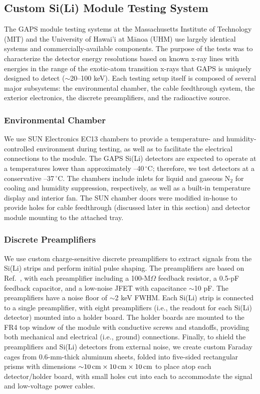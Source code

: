 \documentclass[journal]{IEEEtran}
\begin{document}
%
\subsection{Custom Si(Li) Module Testing System}
The GAPS module testing systems at the Massachusetts Institute of Technology (MIT) and the University of Hawai'i at M{\=a}noa (UHM) use largely identical systems and commercially-available components. The purpose of the tests was to characterize the detector energy resolutions based on known x-ray lines with energies in the range of the exotic-atom transition x-rays that GAPS is uniquely designed to detect (${\sim}$20--100 keV). Each testing setup itself is composed of several major subsystems: the environmental chamber, the cable feedthrough system, the exterior electronics, the discrete preamplifiers, and the radioactive source.
%
\subsubsection{Environmental Chamber}
We use SUN Electronics EC13 chambers to provide a temperature- and humidity-controlled environment during testing, as well as to facilitate the electrical connections to the module. The GAPS Si(Li) detectors are expected to operate at a temperatures lower than approximately --40$\,^{\circ}$C; therefore, we test detectors at a conservative --37$\,^{\circ}$C. The chambers include inlets for liquid and gaseous N$_2$ for cooling and humidity suppression, respectively, as well as a built-in temperature display and interior fan. The SUN chamber doors were modified in-house to provide holes for cable feedthrough (discussed later in this section) and detector module mounting to the attached tray. 
%
\subsubsection{Discrete Preamplifiers}
We use custom charge-sensitive discrete preamplifiers to extract signals from the Si(Li) strips and perform initial pulse shaping. The preamplifiers are based on Ref.~\cite{Fabris:1999}, with each preamplifier including a 100-M$\Omega$ feedback resistor, a 0.5-pF feedback capacitor, and a low-noise JFET with capacitance ${\sim}$10 pF. The preamplifiers have a noise floor of ${\sim}$2 keV FWHM. Each Si(Li) strip is connected to a single preamplifier, with eight preamplifiers (i.e., the readout for each Si(Li) detector) mounted into a holder board. The holder boards are mounted to the FR4 top window of the module with conductive screws and standoffs, providing both mechanical and electrical (i.e., ground) connections.  Finally, to shield the preamplifiers and Si(Li) detectors from external noise, we create custom Faraday cages from 0.6-mm-thick aluminum sheets, folded into five-sided rectangular prisms with dimensions ${\sim}10\text{\,cm}\times 10\text{\,cm}\times 10\text{\,cm}$ to place atop each detector/holder board, with small holes cut into each to accommodate the signal and low-voltage power cables.
%
\end{document}
